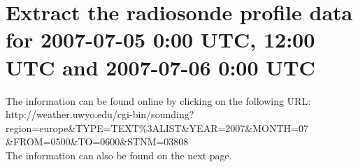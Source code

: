 \documentclass{article}
\begin{document}
\section{Extract the radiosonde profile data for 2007-07-05 0:00 UTC, 12:00 UTC and 2007-07-06 0:00 UTC}
The information can be found online by clicking on the following URL:\\
http://weather.uwyo.edu/cgi-bin/sounding?region=europe\&TYPE=TEXT\%3ALIST\&YEAR=2007\&MONTH=07\\
\&FROM=0500\&TO=0600\&STNM=03808\\

The information can also be found on the next page.
\end{document}
